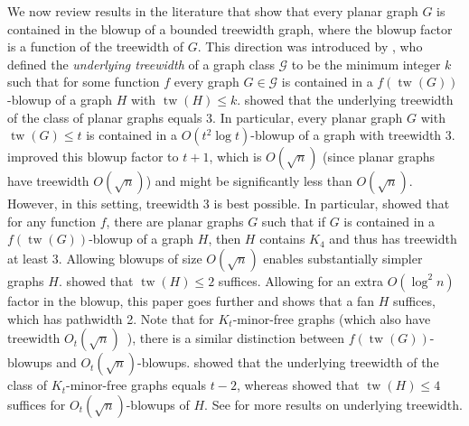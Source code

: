 \documentclass{patmorin}
\renewcommand{\le}{\leqslant}
\renewcommand{\leq}{\leqslant}
\newcommand{\pat}[1]{\textcolor{Blue}{Pat: #1}}
\newcommand{\defin}[1]{\emph{\textcolor{brightmaroon}{#1}}}
\DeclareMathOperator{\tw}{tw}
\newcommand{\GG}{\mathcal{G}}
\begin{document}

We now review results in the literature that show that every planar graph $G$ is contained in the blowup of a bounded treewidth graph, where the blowup factor is a function of the treewidth of $G$. This direction was introduced by \citet{UTW}, who defined the \defin{underlying treewidth} of a graph class $\GG$ to be the minimum integer $k$ such that for some function $f$ every graph $G\in\GG$ is contained in a $f(\tw(G))$-blowup of a graph $H$ with $\tw(H)\leq k$. \citet{UTW} showed that the underlying treewidth of the class of planar graphs equals 3. In particular, every planar graph $G$ with $\tw(G)\leq t$ is contained in a $O(t^2\log t)$-blowup of a graph with treewidth 3. \citet{ISW} improved this blowup factor to $t+1$, which is $O(\sqrt{n})$ (since planar graphs have treewidth $O(\sqrt{n})$) and might be significantly less than $O(\sqrt{n})$.  However, in this setting, treewidth 3 is best possible. In particular, \citet{UTW} showed that for any function $f$, there are planar graphs $G$ such that if $G$ is contained in a $f(\tw(G))$-blowup of a graph $H$, then $H$ contains $K_4$ and thus has treewidth at least 3. Allowing blowups of size $O(\sqrt{n})$ enables substantially simpler graphs $H$. \citet{distel.dujmovic.ea:product} showed that $\tw(H)\leq 2$ suffices. Allowing for an extra $O(\log^2n)$ factor in the blowup, this paper goes further and shows that a fan $H$ suffices, which has pathwidth 2. Note that for $K_t$-minor-free graphs (which also have treewidth $O_t(\sqrt{n})$~\citep{AST90}), there is a similar distinction between $f(\tw(G))$-blowups and $O_t(\sqrt{n})$-blowups. \citet{UTW} showed that the underlying treewidth of the class of $K_t$-minor-free graphs equals $t-2$, whereas 
\citet{distel.dujmovic.ea:product} showed that $\tw(H)\leq 4$ suffices for $O_t(\sqrt{n})$-blowups of $H$. See \citep{DHHJLMMRW} for more results on underlying treewidth. 

\end{document}
